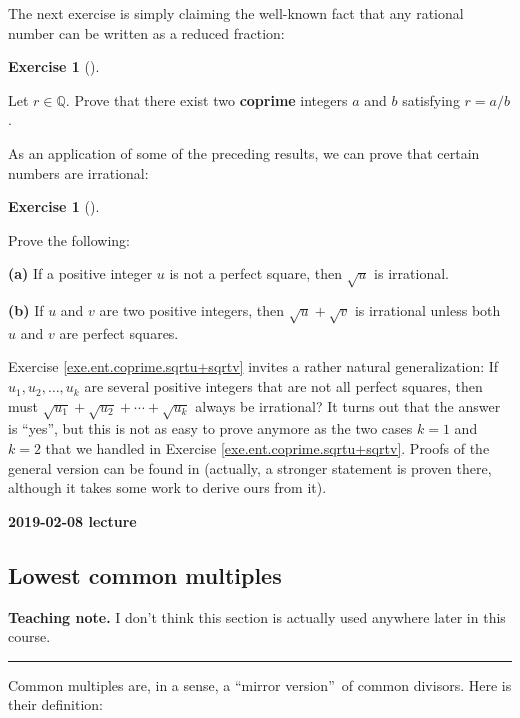 \documentclass[numbers=enddot,12pt,final,onecolumn,notitlepage]{scrartcl}%
\newcounter{exer}
\numberwithin{exer}{subsection}
\theoremstyle{definition}
\newtheorem{exmp}[exer]{Exercise}
\newenvironment{exercise}[1][]
{\begin{exmp}[#1]\begin{leftbar}}
{\end{leftbar}\end{exmp}}
\newenvironment{teachingnote}[1][Teaching note]{\noindent\textbf{#1.} }{\ \rule{0.5em}{0.5em}}
\newenvironment{teachingnote}{}{}
\begin{document}
The next exercise is simply claiming the well-known fact that any rational
number can be written as a reduced fraction:

\begin{exercise}
\label{exe.ent.coprime.frac-red}Let $r\in\mathbb{Q}$. Prove that there exist
two \textbf{coprime} integers $a$ and $b$ satisfying $r=a/b$.
\end{exercise}

As an application of some of the preceding results, we can prove that certain
numbers are irrational:

\begin{exercise}
\label{exe.ent.coprime.sqrtu+sqrtv}Prove the following:

\textbf{(a)} If a positive integer $u$ is not a perfect square\footnotemark,
then $\sqrt{u}$ is irrational.

\textbf{(b)} If $u$ and $v$ are two positive integers, then $\sqrt{u}+\sqrt
{v}$ is irrational unless both $u$ and $v$ are perfect squares.
\end{exercise}

%
Exercise \ref{exe.ent.coprime.sqrtu+sqrtv} invites a rather natural
generalization: If $u_{1},u_{2},\ldots,u_{k}$ are several positive integers
that are not all perfect squares, then must $\sqrt{u_{1}}+\sqrt{u_{2}}%
+\cdots+\sqrt{u_{k}}$ always be irrational? It turns out that the answer is
\textquotedblleft yes\textquotedblright, but this is not as easy to prove
anymore as the two cases $k=1$ and $k=2$ that we handled in Exercise
\ref{exe.ent.coprime.sqrtu+sqrtv}. Proofs of the general version can be found
in \cite{Boreic08} (actually, a stronger statement is proven there, although
it takes some work to derive ours from it).

\begin{center}
\textbf{2019-02-08 lecture}
\end{center}

\subsection{Lowest common multiples}

\begin{teachingnote}
I don't think this section is actually used anywhere later in this course.
\end{teachingnote}

Common multiples are, in a sense, a \textquotedblleft mirror
version\textquotedblright\ of common divisors. Here is their definition:
\end{document}
